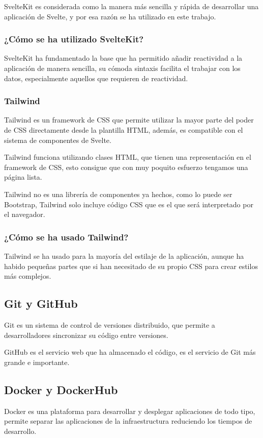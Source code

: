 SvelteKit es considerada como la manera más sencilla y rápida de desarrollar una aplicación de Svelte, y por esa razón se ha utilizado en este trabajo.

\subsubsection{¿Cómo se ha utilizado SvelteKit?}
SvelteKit ha fundamentado la base que ha permitido añadir reactividad a la aplicación de manera sencilla, su cómoda sintaxis facilita el trabajar con los datos, especialmente aquellos que requieren de reactividad.

\subsubsection{Tailwind}
Tailwind es un framework de CSS que permite utilizar la mayor parte del poder de CSS directamente desde la plantilla HTML, además, es compatible con el sistema de componentes de Svelte.

Tailwind funciona utilizando clases HTML, que tienen una representación en el framework de CSS, esto consigue que con muy poquito esfuerzo tengamos una página lista.

Tailwind no es una librería de componentes ya hechos, como lo puede ser Bootstrap, Tailwind solo incluye código CSS que es el que será interpretado por el navegador.

\subsubsection{¿Cómo se ha usado Tailwind?}
Tailwind se ha usado para la mayoría del estilaje de la aplicación, aunque ha habido pequeñas partes que si han necesitado de su propio CSS para crear estilos más complejos.

\subsection{Git y GitHub}
Git es un sistema de control de versiones distribuido, que permite a desarrolladores sincronizar su código entre versiones.

GitHub es el servicio web que ha almacenado el código, es el servicio de Git más grande e importante.

\subsection{Docker y DockerHub}
Docker es una plataforma para desarrollar y desplegar aplicaciones de todo tipo, permite separar las aplicaciones de la infraestructura reduciendo los tiempos de desarrollo.

